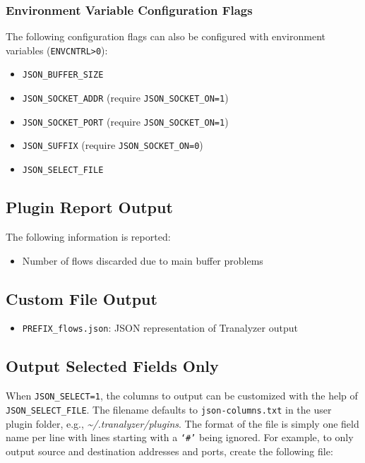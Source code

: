 \documentclass[documentation]{subfiles}
\begin{document}
\subsubsection{Environment Variable Configuration Flags}
The following configuration flags can also be configured with environment variables ({\tt ENVCNTRL>0}):
\begin{itemize}
    \item {\tt JSON\_BUFFER\_SIZE}
    \item {\tt JSON\_SOCKET\_ADDR} (require {\tt JSON\_SOCKET\_ON=1})
    \item {\tt JSON\_SOCKET\_PORT} (require {\tt JSON\_SOCKET\_ON=1})
    \item {\tt JSON\_SUFFIX} (require {\tt JSON\_SOCKET\_ON=0})
    \item {\tt JSON\_SELECT\_FILE}
\end{itemize}

\subsection{Plugin Report Output}
The following information is reported:
\begin{itemize}
    \item Number of flows discarded due to main buffer problems
\end{itemize}

\subsection{Custom File Output}
\begin{itemize}
    \item {\tt PREFIX\_flows.json}: JSON representation of Tranalyzer output
\end{itemize}

\subsection{Output Selected Fields Only}\label{json:select}

When {\tt JSON\_SELECT=1}, the columns to output can be customized with the help of {\tt JSON\_SELECT\_FILE}.
The filename defaults to {\tt json-columns.txt} in the user plugin folder, e.g., {\em \textasciitilde{}/.tranalyzer/plugins}.
The format of the file is simply one field name per line with lines starting with a {\tt `\#'} being ignored.
For example, to only output source and destination addresses and ports, create the following file:
\end{document}
